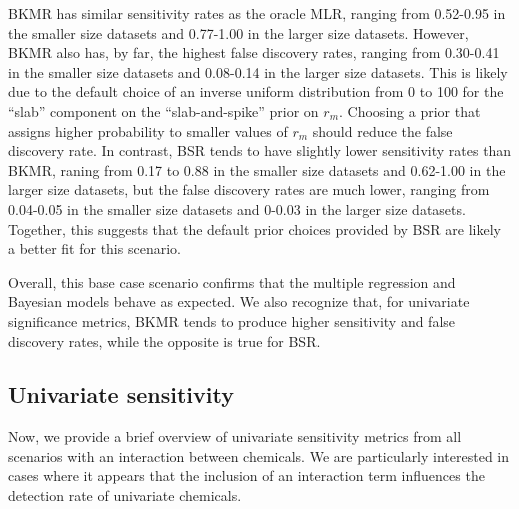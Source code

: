 \documentclass[12pt, twoside]{amherstthesis}
\begin{document}
BKMR has similar sensitivity rates as the oracle MLR, ranging from 0.52-0.95 in the smaller size datasets and 0.77-1.00 in the larger size datasets. However, BKMR also has, by far, the highest false discovery rates, ranging from 0.30-0.41 in the smaller size datasets and 0.08-0.14 in the larger size datasets. This is likely due to the default choice of an inverse uniform distribution from 0 to 100 for the ``slab'' component on the ``slab-and-spike'' prior on \(r_m\). Choosing a prior that assigns higher probability to smaller values of \(r_m\) should reduce the false discovery rate. In contrast, BSR tends to have slightly lower sensitivity rates than BKMR, raning from 0.17 to 0.88 in the smaller size datasets and 0.62-1.00 in the larger size datasets, but the false discovery rates are much lower, ranging from 0.04-0.05 in the smaller size datasets and 0-0.03 in the larger size datasets. Together, this suggests that the default prior choices provided by BSR are likely a better fit for this scenario.

Overall, this base case scenario confirms that the multiple regression and Bayesian models behave as expected. We also recognize that, for univariate significance metrics, BKMR tends to produce higher sensitivity and false discovery rates, while the opposite is true for BSR.

\hypertarget{univsenschap}{%
\subsection{Univariate sensitivity}\label{univsenschap}}

Now, we provide a brief overview of univariate sensitivity metrics from all scenarios with an interaction between chemicals. We are particularly interested in cases where it appears that the inclusion of an interaction term influences the detection rate of univariate chemicals.
\end{document}
